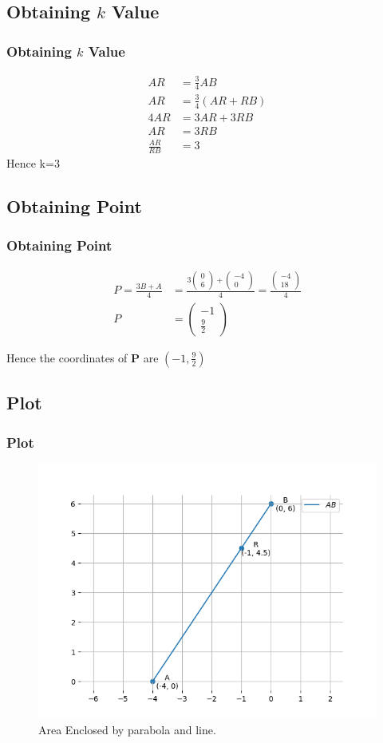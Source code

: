 \documentclass{beamer}
\providecommand{\brak}[1]{\ensuremath{\left(#1\right)}}
\theoremstyle{remark}
\newcommand{\myvec}[1]{\ensuremath{\begin{pmatrix}#1\end{pmatrix}}}
\let\vec\mathbf
\numberwithin{equation}{section}
\begin{document}
\subsection{Obtaining $k$ Value}
\begin{frame}
\frametitle{Obtaining $k$ Value}
\begin{align}
	AR&=\frac{3}{4}AB \\
    AR&=\frac{3}{4}(AR+RB) \\
    4AR&=3AR+3RB \\
    AR&=3RB\\
\frac{AR}{RB}&=3
\end{align}
Hence k=3
\end{frame}
\subsection{Obtaining Point}
\begin{frame}
\frametitle{Obtaining Point}

\begin{align}
P=\frac{3B+A}{4}&=\frac{3\myvec{0\\6}+\myvec{-4\\0}}{4}=\frac{\myvec{-4\\18}}{4} \\
P&=\myvec{-1\\\frac{9}{2}}
\end{align}

Hence the coordinates of $\vec{P}$ are $\brak{-1,\frac{9}{2}}$



\end{frame}

\subsection{Plot}
\begin{frame}[fragile]
\frametitle{Plot}

\begin{figure}[h!]
   \centering
   \includegraphics[width=0.9\linewidth]{figs/fig1.png}
	\caption{Area Enclosed by parabola and line. }
   \label{stemplot}
\end{figure}
\end{frame}
\end{document}
